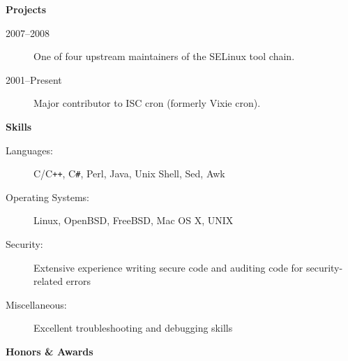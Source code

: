 \documentclass[letterpaper,11pt]{article}
\newcommand{\resheading}[1]{{\large \colorbox{mygrey}{\begin{minipage}{\textwidth}{\textbf{#1 \vphantom{p\^{E}}}}\end{minipage}}}}
\begin{document}
\resheading{Projects}

\begin{description}
\item[2007--2008] One of four upstream maintainers of the SELinux tool chain.
\item[2001--Present] Major contributor to ISC cron (formerly Vixie cron).

\end{description}


\resheading{Skills}

\begin{description}
\item[Languages:]
C/C{}\verb!++!, C{}\verb!#!, Perl, Java, Unix Shell, Sed, Awk
\item[Operating Systems:]
Linux, OpenBSD, FreeBSD, Mac OS X, {\sc UNIX}
\item[Security:]
Extensive experience writing secure code and auditing code for security-related errors
\item[Miscellaneous:]
Excellent troubleshooting and debugging skills
\end{description}

\resheading{Honors \& Awards}
\end{document}
